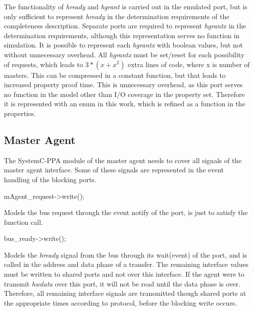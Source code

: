 The functionality of \textit{hready} and \textit{hgrant} is carried out in the emulated port, but is only sufficient to represent \textit{hready} in the determination requirements of the completeness description. Separate ports are required to represent \textit{hgrantx} in the determination requirements, although this representation serves no function in simulation. It is possible to represent each \textit{hgrantx} with boolean values, but not without unnecessary overhead. All \textit{hgrantx} must be set/reset for each possibility of requests, which leads to $3*(x+x^2)$ extra lines of code, where x is number of masters. This can be compressed in a constant function, but that leads to increased property proof time. This is unnecessary overhead, as this port serves no function in the model other than I/O coverage in the property set. Therefore it is represented with an enum in this work, which is refined as a function in the properties. \par
{} 
 

\subsection{Master Agent}
The SystemC-PPA module of the master agent needs to cover all signals of the master agent interface. Some of these signals are represented in the event handling of the blocking ports. \par
mAgent\_request->write(); \par
Models the bus request through the event notify of the port,  is just to satisfy the function call. \par
bus\_ready->write(); \par

Models the \textit{hready} signal from the bus through its wait(event) of the port, and is called in the address and data phase of a transfer. The remaining interface values must be written to shared ports and not over this interface. If the agent were to transmit \textit{hwdata} over this port, it will not be read until the data phase is over. Therefore, all remaining interface signals are transmitted though shared ports at the appropriate times according to protocol, before the blocking write occurs.  
 
